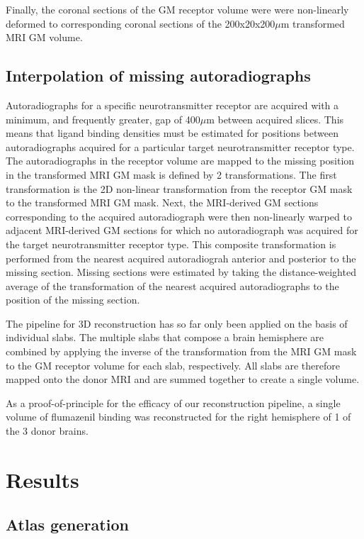 \documentclass[12pt]{article}
\begin{document}
    Finally, the coronal sections of the GM receptor volume were were non-linearly deformed to corresponding coronal sections of the 200x20x200$\mu$m transformed MRI GM volume.
    
\subsection{Interpolation of missing autoradiographs}

Autoradiographs for a specific neurotransmitter receptor are acquired with a minimum, and frequently greater, gap of 400$\mu$m between acquired slices. This means that ligand binding densities must be estimated for positions between autoradiographs acquired for a particular target neurotransmitter receptor type. The autoradiographs in the receptor volume are mapped to the missing position in the transformed MRI GM mask is defined by 2 transformations. The first transformation is the 2D non-linear transformation from the receptor GM mask to the transformed MRI GM mask. Next, the MRI-derived GM sections corresponding to the acquired autoradiograph were then non-linearly warped to adjacent MRI-derived GM sections for which no autoradiograph was acquired for the target neurotransmitter receptor type. This composite transformation is performed from the nearest acquired autoradiograh anterior and posterior to the missing section. Missing sections were estimated by taking the distance-weighted average of the transformation of the nearest acquired autoradiographs to the position of the missing section. 

The pipeline for 3D reconstruction has so far only been applied on the basis of individual slabs. The multiple slabs that compose a brain hemisphere are combined by applying the inverse of the transformation from the MRI GM mask to the GM receptor volume for each slab, respectively. All slabs are therefore mapped onto the donor MRI and are summed together to create a single volume. 

As a proof-of-principle for the efficacy of our reconstruction pipeline, a single volume of flumazenil binding was reconstructed for the right hemisphere of 1 of the 3 donor brains. 

\section{Results}



\Discussion{}
\subsection{Atlas generation}
\end{document}
